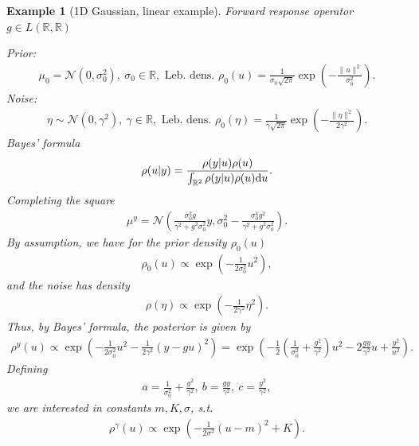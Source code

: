 \documentclass[oneside]{article}
\numberwithin{equation}{section}
\newtheorem{example}{Example}[section]
\begin{document}
\newpage
\begin{example}[1D Gaussian, linear example]
    Forward response operator $g\in L(\mathbb{R},\mathbb{R})$
    
    Prior:
    \begin{align*}
        \mu_0 = \mathcal{N}(0,\sigma_0^2),\ \sigma_0\in\mathbb{R}, \mbox{ Leb. dens. } \rho_0(u) = \frac{1}{\sigma_0\sqrt{2\pi}}\exp\left(-\frac{\|u\|^2}{\sigma_0^2}\right).
    \end{align*}
    Noise:
    \begin{align*}
        \eta\sim\mathcal{N}(0,\gamma^2),\ \gamma\in\mathbb{R}, \mbox{ Leb. dens. } \rho_0(\eta) = \frac{1}{\gamma\sqrt{2\pi}}\exp\left(-\frac{\|\eta\|^2}{2\gamma^2}\right).
    \end{align*}
    Bayes' formula
    \begin{align*}
        \rho(u|y) = \frac{\rho(y|u)\rho(u)}{\int_{\mathbb{R}^2} \rho(y|u)\rho(u){\rm d}u}.
    \end{align*}
    Completing the square
    \begin{align*}
        \mu^y = \mathcal{N}\left(\frac{\sigma_0^2g}{\gamma^2 + g^2\sigma_0^2}y,\sigma_0^2 - \frac{\sigma_0^4g^2}{\gamma^2 + g^2\sigma_0^2}\right).
    \end{align*}
    By assumption, we have for the prior density $\rho_0(u)$
    \begin{align*}
        \rho_0(u)\propto\exp\left(-\frac{1}{2\sigma_0^2}u^2\right),
    \end{align*}
    and the noise has density
    \begin{align*}
        \rho(\eta)\propto\exp\left(-\frac{1}{2\gamma^2}\eta^2\right).
    \end{align*}
    Thus, by Bayes' formula, the posterior is given by
    \begin{align*}
        \rho^y(u)\propto\exp\left(-\frac{1}{2\sigma_0^2}u^2 - \frac{1}{2\gamma^2}(y - gu)^2\right) = \exp\left(-\frac{1}{2}\left(\frac{1}{\sigma_0^2} + \frac{g^2}{\gamma^2}\right)u^2 - 2\frac{gy}{\gamma^2}u + \frac{y^2}{u^2}\right).
    \end{align*}
    Defining
    \begin{align*}
        a = \frac{1}{\sigma_0^2} + \frac{g^2}{\gamma^2},\ b = \frac{gy}{\gamma^2},\ c = \frac{y^2}{\gamma^2},
    \end{align*}
    we are interested in constants $m,K,\sigma$, s.t.
    \begin{align*}
        \rho^\gamma(u)\propto\exp\left(-\frac{1}{2\sigma^2}(u - m)^2 + K\right).

\end{align*}
\end{example}
\end{document}
